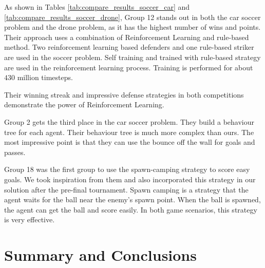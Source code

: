 \documentclass[a4paper,12pt]{article}
\begin{document}
As shown in Tables \ref{tab:compare_results_soccer_car} and \ref{tab:compare_results_soccer_drone}, Group 12 stands out in both the car soccer problem and the drone problem, as it has the highest number of wins and points. Their approach uses a combination of Reinforcement Learning and rule-based method. Two reinforcement learning based defenders and one rule-based striker are used in the soccer problem. Self training and trained with rule-based strategy are used in the reinforcement learning process. Training is performed for about $430$ million timesteps.

Their winning streak and impressive defense strategies in both competitions demonstrate the power of Reinforcement Learning.

Group 2 gets the third place in the car soccer problem. They build a behaviour tree for each agent. Their behaviour tree is much more complex than ours.
The most impressive point is that they can use the bounce off the wall for goals and passes.

Group 18 was the first group to use the spawn-camping strategy to score easy goals. We took inspiration from them and also incorporated this strategy in our solution after the pre-final tournament. Spawn camping is a strategy that the agent waits for the ball near the enemy's spawn point.  When the ball is spawned, the agent can get the ball and score easily. In both game scenarios, this strategy is very effective.






\section{Summary and Conclusions}
\end{document}
